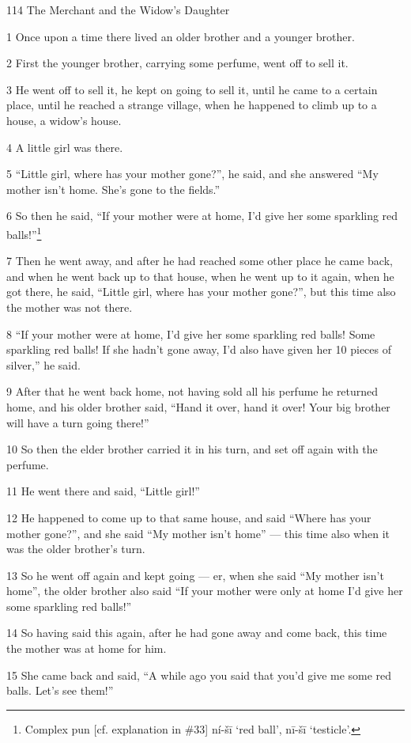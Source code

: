 
114 The Merchant and the Widow's Daughter

1 Once upon a time there lived an older brother and a younger brother.

2 First the younger brother, carrying some perfume, went off to sell it.

3 He went off to sell it, he kept on going to sell it, until he came to a certain
place, until he reached a strange village, when he happened to climb up to a house,
a widow's house.

4 A little girl was there.

5 ``Little girl, where has your mother gone?'', he said, and she answered ``My
mother isn't home. She's gone to the fields.''

6 So then he said, ``If your mother were at home, I'd give her some sparkling red
balls!''\footnote{Complex pun [cf. explanation in \#33] ní-šī `red ball', nī-šī `testicle'.}

7 Then he went away, and after he had reached some other place he came back, and
when he went back up to that house, when he went up to it again, when he got there,
he said, ``Little girl, where has your mother gone?'', but this time also the mother
was not there.

8 ``If your mother were at home, I'd give her some sparkling red balls! Some sparkling
red balls! If she hadn't gone away, I'd also have given her 10 pieces of silver,''
he said.

9 After that he went back home, not having sold all his perfume he returned home,
and his older brother said, ``Hand it over, hand it over! Your big brother will
have a turn going there!''

10 So then the elder brother carried it in his turn, and set off again with the
perfume.

11 He went there and said, ``Little girl!''

12 He happened to come up to that same house, and said ``Where has your mother
gone?'', and she said ``My mother isn't home'' --- this time also when it was the
older brother's turn.

13 So he went off again and kept going --- er, when she said ``My mother isn't
home'', the older brother also said ``If your mother were only at home I'd give
her some sparkling red balls!''

14 So having said this again, after he had gone away and come back, this time the
mother was at home for him.

15 She came back and said, ``A while ago you said that you'd give me some red balls.
Let's see them!''

